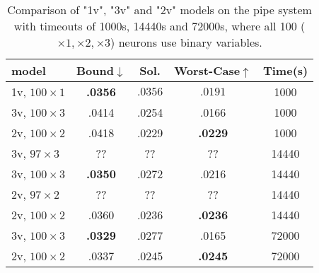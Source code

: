 		
	\begin{table}[h!]
	\begin{tabular}{||l||c|c|c|c||}\hline\hline
		model &        Bound$\downarrow$ &  Sol. &      Worst-Case$\uparrow$ &  Time(s) \\\hline \hline
		1v, $100 \times 1$ &     {\bf .0356} &  $.0356$ & $.0191$ &  1000 \\\hline
		3v, $100 \times 3$&     .0414 &  .0254 &  .0166 &  1000 \\\hline
		2v, $100 \times 2$&     .0418 &  .0229 &   {\bf .0229} &  1000 \\\hline \hline
	3v, $97 \times 3$&      ?? &  ?? &  ?? & 14440 \\\hline
		3v, $100 \times 3$&      {\bf .0350} &  .0272 &  .0216 & 14440 \\\hline
	2v, $97 \times 2$&     ?? &  ?? &   ?? & 14440 \\\hline
		2v, $100 \times 2$&     .0360 &  .0236 &    {\bf .0236} & 14440 \\\hline \hline
		3v, $100 \times 3$&     {\bf .0329} &  .0277 &  .0165 & 72000 \\\hline
		2v, $100 \times 2$&     .0337 &  .0245 &  {\bf .0245} & 72000 \\\hline\hline
	\end{tabular}
	\caption{Comparison of "1v", "3v" and "2v" models on the pipe system with timeouts of 1000s, 14440s and 72000s, where all 100 ($\times 1, \times 2,\times 3$) neurons use binary variables.}
	\label{table.pipe}
\end{table}



